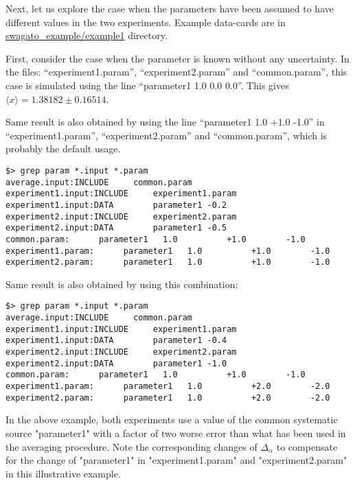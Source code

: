 \documentclass[12pt,a4paper,dvips]{article}
\begin{document}
Next, let us explore the case when the parameters have been assumed to have different values in the two experiments.
Example data-cards are in \url{swagato_example/example1} directory.

First, consider the case when the parameter is known without any uncertainty.
In the files: ``experiment1.param'', ``experiment2.param'' and ``common.param'',
this case is simulated using the line ``parameter1   1.0            0.0         0.0''.
This gives $\langle x \rangle = 1.38182 \pm 0.16514$.

Same result is also obtained by using the line ``parameter1   1.0          +1.0        -1.0'' 
in ``experiment1.param'', ``experiment2.param'' and ``common.param'', which is probably the default usage.
\vspace*{-.5cm}
\begin{verbatim}
$> grep param *.input *.param 
average.input:INCLUDE     common.param
experiment1.input:INCLUDE     experiment1.param
experiment1.input:DATA        parameter1 -0.2
experiment2.input:INCLUDE     experiment2.param
experiment2.input:DATA        parameter1 -0.5
common.param:      parameter1   1.0          +1.0        -1.0 
experiment1.param:      parameter1   1.0          +1.0        -1.0 
experiment2.param:      parameter1   1.0          +1.0        -1.0 
\end{verbatim}
\vspace*{-.5cm}

Same result is also obtained by using this combination:
\vspace*{-.5cm}
\begin{verbatim}
$> grep param *.input *.param
average.input:INCLUDE     common.param
experiment1.input:INCLUDE     experiment1.param
experiment1.input:DATA        parameter1 -0.4
experiment2.input:INCLUDE     experiment2.param
experiment2.input:DATA        parameter1 -1.0
common.param:      parameter1   1.0          +1.0        -1.0 
experiment1.param:      parameter1   1.0          +2.0        -2.0
experiment2.param:      parameter1   1.0          +2.0        -2.0
\end{verbatim}
\vspace*{-.5cm}

In the above example, both experiments use a value of the common systematic source "parameter1"
with a factor of two worse error than what has been used in the averaging procedure.
Note the corresponding changes of $\Delta_\alpha$ to compensate for the change
of "parameter1" in "experiment1.param" and "experiment2.param" in this illustrative example.
\end{document}
